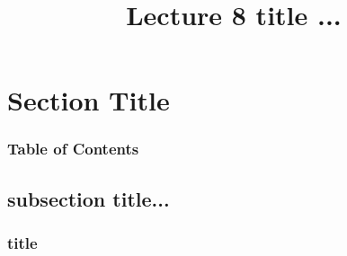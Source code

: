 \documentclass[xcolor=dvipsnames]{beamer}
\begin{document}
	\title[Lecture 8]{Lecture 8 title ...}
	\author[]{\className}
	\institute[\className]{\departmentName}
	\date{} 


	\begin{frame}
		\maketitle
	\end{frame}


\section{Section Title} 

	\begin{frame} \frametitle{Table of Contents}
		\tableofcontents[currentsection]
	\end{frame} 
	
	
	\subsection{subsection title...}
	
		\begin{frame} \frametitle{title}
	
		\end{frame}
\end{document}
